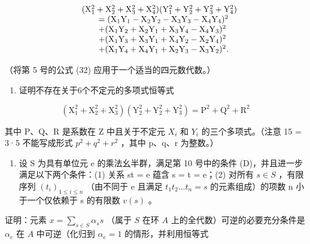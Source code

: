 \[
\begin{array}{r l} & (\mathrm{X} _ {1} ^ {2} + \mathrm{X} _ {2} ^ {2} + \mathrm{X} _ {3} ^ {2} + \mathrm{X} _ {4} ^ {2}) (\mathrm{Y} _ {1} ^ {2} + \mathrm{Y} _ {2} ^ {2} + \mathrm{Y} _ {3} ^ {2} + \mathrm{Y} _ {4} ^ {2}) \\ & \qquad = (\mathrm{X} _ {1} \mathrm{Y} _ {1} - \mathrm{X} _ {2} \mathrm{Y} _ {2} - \mathrm{X} _ {3} \mathrm{Y} _ {3} - \mathrm{X} _ {4} \mathrm{Y} _ {4}) ^ {2} \\ & \qquad + (\mathrm{X} _ {1} \mathrm{Y} _ {2} + \mathrm{X} _ {2} \mathrm{Y} _ {1} + \mathrm{X} _ {3} \mathrm{Y} _ {4} - \mathrm{X} _ {4} \mathrm{Y} _ {3}) ^ {2} \\ & \qquad + (\mathrm{X} _ {1} \mathrm{Y} _ {3} + \mathrm{X} _ {3} \mathrm{Y} _ {1} + \mathrm{X} _ {4} \mathrm{Y} _ {2} - \mathrm{X} _ {2} \mathrm{Y} _ {4}) ^ {2} \\ & \qquad + (\mathrm{X} _ {1} \mathrm{Y} _ {4} + \mathrm{X} _ {4} \mathrm{Y} _ {1} + \mathrm{X} _ {2} \mathrm{Y} _ {3} - \mathrm{X} _ {3} \mathrm{Y} _ {2}) ^ {2}. \end{array}
\]

（将第 5 号的公式 (32) 应用于一个适当的四元数代数。）

\begin{enumerate}
\def\labelenumi{\arabic{enumi}.}
\setcounter{enumi}{19}
\tightlist
\item
  证明不存在关于6个不定元的多项式恒等式
\end{enumerate}

\[
(\mathrm{X} _ {1} ^ {2} + \mathrm{X} _ {2} ^ {2} + \mathrm{X} _ {3} ^ {2}) (\mathrm{Y} _ {2} ^ {2} + \mathrm{Y} _ {2} ^ {2} + \mathrm{Y} _ {3} ^ {2}) = \mathrm{P} ^ {2} + \mathrm{Q} ^ {2} + \mathrm{R} ^ {2}
\]

其中 P、Q、R 是系数在 Z 中且关于不定元 \(X_{i}\) 和 \(Y_{i}\) 的三个多项式。（注意 15 = 3·5 不能写成形式 \(p^{2} + q^{2} + r^{2}\) ，其中 p、q、r 为整数。）

\begin{enumerate}
\def\labelenumi{\arabic{enumi}.}
\setcounter{enumi}{20}
\tightlist
\item
  设 S 为具有单位元 e 的乘法幺半群，满足第 10 号中的条件 (D)，并且进一步满足以下两个条件：(1) 关系 st = e 蕴含 s = t = e；(2) 对所有 \(s \in S\) ，有限序列 \((t_{i})_{1 \leq i \leq n}\) （由不同于 e 且满足 \(t_{1}t_{2} \ldots t_{n} = s\) 的元素组成）的项数 n 小于一个仅依赖于 s 的有限数 \(v(s)\) 。
\end{enumerate}

证明：元素 \(x = \sum_{s \in S} \alpha_s s\) （属于 \(S\) 在环 \(A\) 上的全代数）可逆的必要充分条件是 \(\alpha_e\) 在 \(A\) 中可逆（化归到 \(\alpha_e = 1\) 的情形，并利用恒等式

